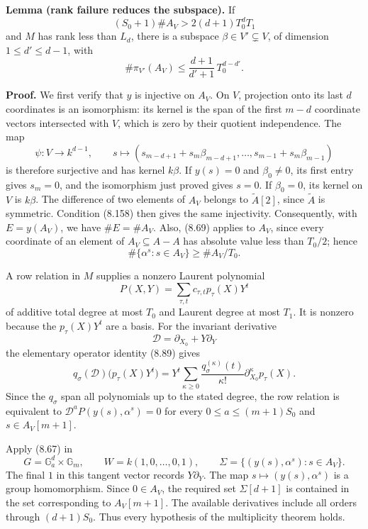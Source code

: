 \documentclass[
  11pt,
  a4paper,
]{article}
\begin{document}
\textbf{Lemma (rank failure reduces the subspace).} If \[
(S_0+1)\#A_V>2(d+1)T_0^dT_1
\tag{8.161}
\] and \(M\) has rank less than \(L_d\), there is a subspace
\(\beta\in V'\subsetneq V\), of dimension \(1\le d'\le d-1\), with \[
\#\pi_{V'}(A_V)\le
\frac{d+1}{d'+1}\,T_0^{d-d'}.
\tag{8.162}
\]

\textbf{Proof.} We first verify that \(y\) is injective on \(A_V\). On
\(V\), projection onto its last \(d\) coordinates is an isomorphism: its
kernel is the span of the first \(m-d\) coordinate vectors intersected
with \(V\), which is zero by their quotient independence. The map \[
\psi:V\longrightarrow k^{d-1},\qquad
s\longmapsto
(s_{m-d+1}+s_m\beta_{m-d+1},\ldots,
s_{m-1}+s_m\beta_{m-1})
\] is therefore surjective and has kernel \(k\beta\). If \(y(s)=0\) and
\(\beta_0\ne0\), its first entry gives \(s_m=0\), and the isomorphism
just proved gives \(s=0\). If \(\beta_0=0\), its kernel on \(V\) is
\(k\beta\). The difference of two elements of \(A_V\) belongs to
\(\widetilde A[2]\), since \(\widetilde A\) is symmetric. Condition
(8.158) then gives the same injectivity. Consequently, with
\(E=y(A_V)\), we have \(\#E=\#A_V\). Also, (8.69) applies to \(A_V\),
since every coordinate of an element of \(A_V\subseteq A-A\) has
absolute value less than \(T_0/2\); hence \[
\#\{\alpha^s:s\in A_V\}\ge\#A_V/T_0.
\tag{8.163}
\]

A row relation in \(M\) supplies a nonzero Laurent polynomial \[
P(X,Y)=\sum_{\tau,t}c_{\tau,t}p_\tau(X)Y^t
\] of additive total degree at most \(T_0\) and Laurent degree at most
\(T_1\). It is nonzero because the \(p_\tau(X)Y^t\) are a basis. For the
invariant derivative \[
\mathcal D=\partial_{X_0}+Y\partial_Y
\] the elementary operator identity (8.89) gives \[
q_\sigma(\mathcal D)\bigl(p_\tau(X)Y^t\bigr)
=Y^t\sum_{\kappa\ge0}
\frac{q_\sigma^{(\kappa)}(t)}{\kappa!}
\partial_{X_0}^{\kappa}p_\tau(X).
\] Since the \(q_\sigma\) span all polynomials up to the stated degree,
the row relation is equivalent to \(\mathcal D^aP(y(s),\alpha^s)=0\) for
every \(0\le a\le(m+1)S_0\) and \(s\in A_V[m+1]\).

Apply (8.67) in \[
G=\mathbb G_a^d\times\mathbb G_m,\qquad
W=k(1,0,\ldots,0,1),\qquad
\Sigma=\{(y(s),\alpha^s):s\in A_V\}.
\] The final \(1\) in this tangent vector records \(Y\partial_Y\). The
map \(s\mapsto(y(s),\alpha^s)\) is a group homomorphism. Since
\(0\in A_V\), the required set \(\Sigma[d+1]\) is contained in the set
corresponding to \(A_V[m+1]\). The available derivatives include all
orders through \((d+1)S_0\). Thus every hypothesis of the multiplicity
theorem holds.
\end{document}
